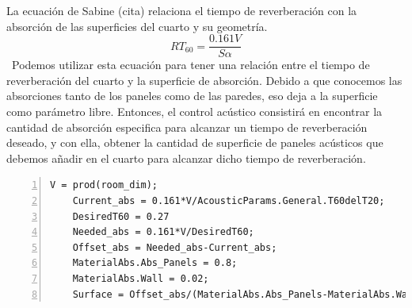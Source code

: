 La ecuación de Sabine (cita) relaciona el tiempo de reverberación con la absorción de las superficies del cuarto y su geometría. 
\begin{displaymath}
    RT_{60} = \frac{0.161 V}{S \alpha}
\end{displaymath}\
Podemos utilizar esta ecuación para tener una relación entre el tiempo de reverberación del cuarto y la superficie de absorción. Debido a que conocemos las absorciones tanto de los paneles como de las paredes, eso deja a la superficie como parámetro libre. Entonces, el control acústico consistirá en encontrar la cantidad de absorción especifica para alcanzar un tiempo de reverberación deseado, y con ella, obtener la cantidad de superficie de paneles acústicos que debemos añadir en el cuarto para alcanzar dicho tiempo de reverberación.
\begin{lstlisting}[frame=single,numbers=left, style=Matlab-editor, basicstyle=\tiny]
    V = prod(room_dim);
    Current_abs = 0.161*V/AcousticParams.General.T60delT20;
    DesiredT60 = 0.27
    Needed_abs = 0.161*V/DesiredT60;
    Offset_abs = Needed_abs-Current_abs;
    MaterialAbs.Abs_Panels = 0.8;
    MaterialAbs.Wall = 0.02;
    Surface = Offset_abs/(MaterialAbs.Abs_Panels-MaterialAbs.Wall)  
\end{lstlisting}

